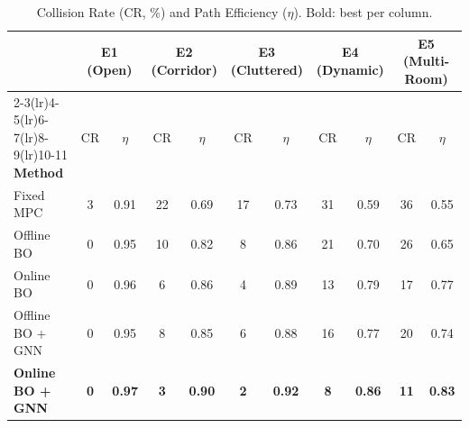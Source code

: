 \documentclass[conference]{IEEEtran}
\begin{document}
\begin{table}[t]
	\centering
	\caption{Collision Rate (CR, \%) and Path Efficiency ($\eta$). Bold: best per column.}
	\label{tab:cr-eta}
	\renewcommand{\arraystretch}{1.15}
	\begin{tabular}{lcccccccccc}
		\toprule
		                         & \multicolumn{2}{c}{\textbf{E1 (Open)}} & \multicolumn{2}{c}{\textbf{E2 (Corridor)}} & \multicolumn{2}{c}{\textbf{E3 (Cluttered)}} & \multicolumn{2}{c}{\textbf{E4 (Dynamic)}} & \multicolumn{2}{c}{\textbf{E5 (Multi-Room)}}                                                                            \\
		\cmidrule(lr){2-3}\cmidrule(lr){4-5}\cmidrule(lr){6-7}\cmidrule(lr){8-9}\cmidrule(lr){10-11}
		\textbf{Method}          & CR                                     & $\eta$                                     & CR                                          & $\eta$                                    & CR                                           & $\eta$        & CR         & $\eta$        & CR          & $\eta$        \\
		\midrule
		Fixed MPC                & 3                                      & 0.91                                       & 22                                          & 0.69                                      & 17                                           & 0.73          & 31         & 0.59          & 36          & 0.55          \\
		Offline BO               & 0                                      & 0.95                                       & 10                                          & 0.82                                      & 8                                            & 0.86          & 21         & 0.70          & 26          & 0.65          \\
		Online BO                & 0                                      & 0.96                                       & 6                                           & 0.86                                      & 4                                            & 0.89          & 13         & 0.79          & 17          & 0.77          \\
		Offline BO + GNN         & 0                                      & 0.95                                       & 8                                           & 0.85                                      & 6                                            & 0.88          & 16         & 0.77          & 20          & 0.74          \\
		\textbf{Online BO + GNN} & \textbf{0}                             & \textbf{0.97}                              & \textbf{3}                                  & \textbf{0.90}                             & \textbf{2}                                   & \textbf{0.92} & \textbf{8} & \textbf{0.86} & \textbf{11} & \textbf{0.83} \\
		\bottomrule
	\end{tabular}
\end{table}
\end{document}
